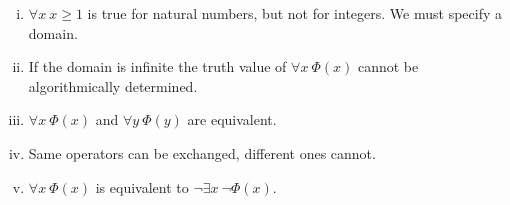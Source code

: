 \documentclass[../../script.tex]{subfiles}
\begin{document}
\begin{rem}\leavevmode
\begin{enumerate}[(i)]
	\item $\forall x ~x \ge 1$ is true for natural numbers, but not for integers. We must specify a domain.
	\item If the domain is infinite the truth value of $\forall x ~\Phi(x)$ cannot be algorithmically determined.
	\item $\forall x ~\Phi(x)$ and $\forall y ~\Phi(y)$ are equivalent.
	\item Same operators can be exchanged, different ones cannot.
	\item $\forall x ~\Phi(x)$ is equivalent to $\neg\exists x ~\neg\Phi(x)$.
\end{enumerate}
\end{rem}
\end{document}
